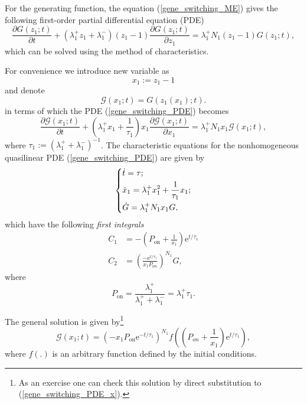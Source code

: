 \documentclass[a4paper, 11pt]{article}
\begin{document}
For the generating function, the equation (\ref{gene_switching_ME}) gives the following first-order partial differential equation (PDE)
\begin{equation} \label{gene_switching_PDE}
  \frac{\partial G(z_1;t)}{\partial t} + (\lambda_1^+z_1 + \lambda_1^-)(z_1-1)\frac{\partial G(z_1;t)}{\partial z_1} = \lambda_1^+N_1(z_1-1)G(z_1;t),
\end{equation}
which can be solved using the method of characteristics.

For convenience we introduce new variable as
\begin{equation*}
  x_1 := z_1 - 1
\end{equation*}
and denote
\begin{equation}
  \mathcal G(x_1; t) = G(z_1(x_1); t).
\end{equation}
in terms of which the PDE (\ref{gene_switching_PDE}) becomes
\begin{equation} \label{gene_switching_PDE_x}
  \frac{\partial \mathcal G(x_1;t)}{\partial t} + (\lambda_1^+x_1 + \frac{1}{\tau_1})x_1\frac{\partial \mathcal G(x_1;t)}{\partial x_1} = \lambda_1^+N_1x_1\mathcal G(x_1;t),
\end{equation}
where $\tau_1 := (\lambda_1^+ + \lambda_1^-)^{-1}$.
The characteristic equations for the nonhomogeneous quasilinear PDE (\ref{gene_switching_PDE}) are given by
\begin{equation*}
  \begin{dcases}
    \dot t = \tau;\\
    \dot x_1 = \lambda_1^+x_1^2 + \frac{1}{\tau_1}x_1;\\
    \dot G = \lambda_1^+N_1x_1G,
  \end{dcases}
\end{equation*}
which have the following {\it first integrals}
\begin{align*}
  C_1& = -\left(P_\text{on}+\frac{1}{x_1}\right)\mathrm e^{t/\tau_1}\\
  C_2& = \left(\frac{-\mathrm e^{t/\tau_1}}{x_1P_{on}}\right)^{N_1}G,
\end{align*}
where
\begin{equation}
  P_\text{on} = \frac{\lambda_1^+}{\lambda_1^+ + \lambda_1^-} = \lambda_1^+\tau_1.
\end{equation}

The general solution is given by\footnote{As an exercise one can check this solution by direct substitution to (\ref{gene_switching_PDE_x}).}
\begin{equation}\label{n1_general_solution}
  \mathcal G(x_1;t) = \left(-x_1P_{\text{on}}\mathrm e^{-t/\tau_1}\right)^{N_1}f\left(\left(P_{on}+\frac{1}{x_1}\right)\mathrm e^{t/\tau_1}\right),
\end{equation}
where $f(.)$ is an arbitrary function defined by the initial conditions.
\end{document}
